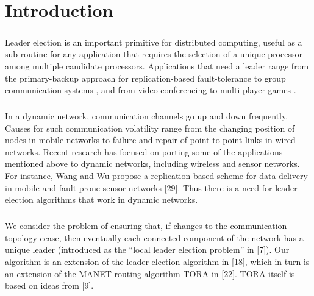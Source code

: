 \chapter{Introduction}
\paragraph{}Leader election is an important primitive for distributed computing, useful as a sub-routine for any application that requires the selection of a unique processor among multiple candidate processors. Applications that need a leader range from the primary-backup approach for replication-based fault-tolerance to group communication systems \cite{26}, and from video conferencing to multi-player games \cite{11}.
\paragraph{}In a dynamic network, communication channels go up and down frequently. Causes for such communication volatility range from the changing position of nodes in mobile networks to failure and repair of point-to-point links in wired networks. Recent research has focused on porting some of the applications mentioned above to dynamic networks, including wireless and sensor networks. For instance, Wang and Wu propose a replication-based scheme for data delivery in mobile and fault-prone sensor networks [29]. Thus there is a need for leader election algorithms that work in dynamic networks.
\paragraph{}We consider the problem of ensuring that, if changes to the communication topology cease, then eventually each connected component of the network has a unique leader (introduced as the “local leader election problem” in [7]). Our algorithm is an extension of the leader election algorithm in [18], which in turn is an extension of the MANET routing algorithm TORA in [22]. TORA itself is based on ideas from [9].
